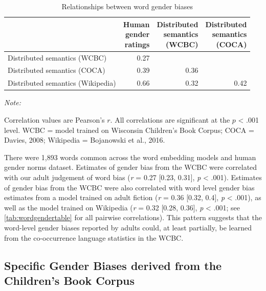 \documentclass[english,,man,floatsintext]{apa6}
\begin{document}
\begin{table}

\caption{\label{tab:wordgendertable}Relationships between word gender biases}
\centering
\fontsize{7}{9}\selectfont
\begin{threeparttable}
\begin{tabular}[t]{lrrr}
\toprule
 & \makecell[l]{Human\\gender\\ratings} & \makecell[l]{Distributed\\semantics\\(WCBC)} & \makecell[l]{Distributed\\semantics\\(COCA)}\\
\midrule
Distributed semantics (WCBC) & 0.27 &  & \\
Distributed semantics (COCA) & 0.39 & 0.36 & \\
Distributed semantics (Wikipedia) & 0.66 & 0.32 & 0.42\\
\bottomrule
\end{tabular}
\begin{tablenotes}[para]
\item \textit{Note:} 
\item Correlation values are Pearson's $r$. All correlations are significant at the $p$ < .001 level. WCBC = model trained on Wisconsin Children’s Book Corpus; COCA = Davies, 2008; Wikipedia = Bojanowski et al., 2016.
\end{tablenotes}
\end{threeparttable}
\end{table}

There were 1,893 words common across the word embedding models and human gender norms dataset. Estimates of gender bias from the WCBC were correlated with our adult judgement of word bias (\emph{r} = 0.27 {[}0.23, 0.31{]}, \emph{p} \textless{} .001). Estimates of gender bias from the WCBC were also correlated with word level gender bias estimates from a model trained on adult fiction (\emph{r} = 0.36 {[}0.32, 0.4{]}, \emph{p} \textless{} .001), as well as the model trained on Wikipedia (\emph{r} = 0.32 {[}0.28, 0.36{]}, \emph{p} \textless{} .001; see \autoref{tab:wordgendertable} for all pairwise correlations). This pattern suggests that the word-level gender biases reported by adults could, at least partially, be learned from the co-occurrence language statistics in the WCBC.

\hypertarget{specific-gender-biases-derived-from-the-childrens-book-corpus}{%
\subsection{Specific Gender Biases derived from the Children's Book Corpus}\label{specific-gender-biases-derived-from-the-childrens-book-corpus}}
\end{document}
